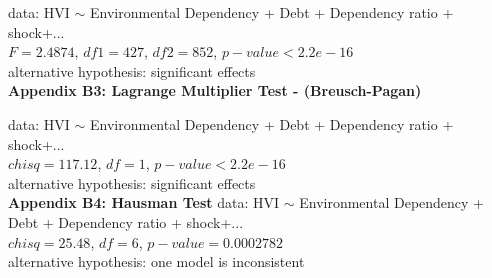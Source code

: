 data:  HVI $ \sim $ Environmental Dependency + Debt + Dependency ratio + shock+...\\
$F = 2.4874$, $df1 = 427$, $df2 = 852$, $p-value < 2.2e-16$\\
alternative hypothesis: significant effects\\

\textbf{Appendix B3: Lagrange Multiplier Test - (Breusch-Pagan)}

data:  HVI $ \sim $ Environmental Dependency + Debt + Dependency ratio + shock+...\\
$chisq = 117.12$, $df = 1$, $p-value < 2.2e-16$\\
alternative hypothesis: significant effects\\

\textbf{Appendix B4: Hausman Test}
data:  HVI $ \sim $ Environmental Dependency + Debt + Dependency ratio + shock+...\\
$chisq = 25.48$, $df = 6$, $p-value = 0.0002782$\\
alternative hypothesis: one model is inconsistent\\